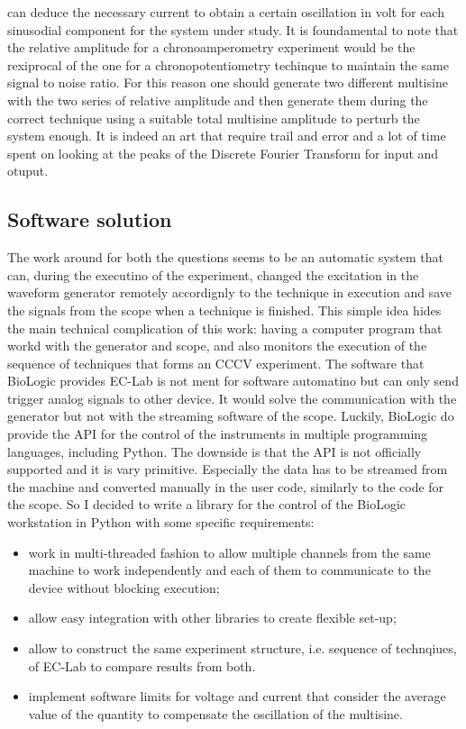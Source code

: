 can deduce the necessary current to obtain a certain oscillation in volt for each sinusodial component for the system under study. It is foundamental to note that the relative amplitude for a chronoamperometry experiment would be the rexiprocal of the one for a chronopotentiometry techinque to maintain the same signal to noise ratio. For this reason one should generate two different multisine with the two series of relative amplitude and then generate them during the correct technique using a suitable total multisine amplitude to perturb the system enough. It is indeed an art that require trail and error and a lot of time spent on looking at the peaks of the Discrete Fourier Transform for input and otuput.\\
\subsection{Software solution}
The work around for both the questions seems to be an automatic system that can, during the executino of the experiment, changed the excitation in the waveform generator remotely accordignly to the technique in execution and save the signals from the scope when a technique is finished. This simple idea hides the main technical complication of this work: having a computer program that workd with the generator and scope, and also monitors the execution of the sequence of techniques that forms an CCCV experiment. The software that BioLogic provides EC-Lab is not ment for software automatino but can only send trigger analog signals to other device. It would solve the communication with the generator but not with the streaming software of the scope. Luckily, BioLogic do provide the API for the control of the instruments in multiple programming languages, including Python. The downside is that the API is not officially supported and it is vary primitive. Especially the data has to be streamed from the machine and converted manually in the user code, similarly to the code for the scope. So I decided to write a library for the control of the BioLogic workstation in Python with some specific requirements:
\begin{itemize}
    \item work in multi-threaded fashion to allow multiple channels from the same machine to work independently and each of them to communicate to the device without blocking execution;
    \item allow easy integration with other libraries to create flexible set-up;
    \item allow to construct the same experiment structure, i.e. sequence of technqiues, of EC-Lab to compare results from both.
    \item implement software limits for voltage and current that consider the average value of the quantity to compensate the oscillation of the multisine.
\end{itemize}

